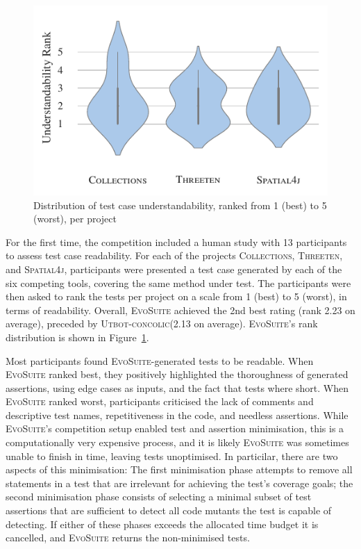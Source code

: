 \documentclass[10pt,conference]{IEEEtran}
\newcommand{\project}[1]{\textsc{#1}\xspace}
\newcommand{\Collections}{\project{Collections}}
\newcommand{\Threeten}{\project{Threeten}}
\newcommand{\Spatial}{\project{Spatial4j}}
\newcommand{\EVOSUITE}{\textsc{EvoSuite}\xspace}
\newcommand{\UtbotConcolic}{\textsc{Utbot-concolic}\xspace}
\begin{document}



\begin{figure}
  \includegraphics[width=\columnwidth]{./data/understandability}
  \caption{Distribution of test case understandability, ranked from 1 (best) to 5 (worst), per project}
  \label{fig:readability}
\end{figure}

For the first time, the competition included a human study with 13
participants to assess test case readability. For each of the projects \Collections,
\Threeten, and \Spatial, participants were presented a test case
generated by each of the six competing tools, covering the same method under
test. The participants were then asked to rank the tests per project
on a scale from 1 (best) to 5 (worst), in terms of readability. Overall,
\EVOSUITE achieved the 2nd best rating (rank 2.23 on average), 
preceded by \UtbotConcolic (2.13 on average). \EVOSUITE's rank distribution
is shown in Figure~\ref{fig:readability}.

Most participants found \EVOSUITE-generated tests to be readable. When
\EVOSUITE ranked best, they positively highlighted the thoroughness of
generated assertions, using edge cases as inputs, and the fact that
tests where short. When \EVOSUITE ranked worst, participants
criticised the lack of comments and descriptive test names,
repetitiveness in the code, and needless assertions. While \EVOSUITE's
competition setup enabled test and assertion minimisation, this is a
computationally very expensive process, and it is likely \EVOSUITE was
sometimes unable to finish in time, leaving tests unoptimised. In
particilar, there are two aspects of this minimisation: The first
minimisation phase attempts to remove all statements in a test that
are irrelevant for achieving the test's coverage goals; the second
minimisation phase consists of selecting a minimal subset of test
assertions that are sufficient to detect all code mutants the test is
capable of detecting. If either of these phases exceeds the allocated
time budget it is cancelled, and \EVOSUITE returns the non-minimised
tests.
\end{document}
